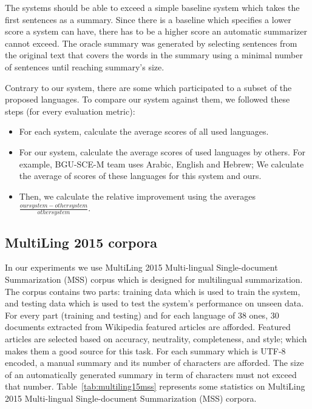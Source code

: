 The systems should be able to exceed a simple baseline system which takes the first sentences as a summary. 
Since there is a baseline which specifies a lower score a system can have, there has to be a higher score an automatic summarizer cannot exceed. 
The oracle summary was generated by selecting sentences from the original text that covers the words in the summary using a minimal number of sentences until reaching summary's size. 

Contrary to our system, there are some which participated to a subset of the proposed languages. 
To compare our system against them, we followed these steps (for every evaluation metric): 
\begin{itemize}
	\item For each system, calculate the average scores of all used languages.
	\item For our system, calculate the average scores of used languages by others. 
	For example, BGU-SCE-M team uses Arabic, English and Hebrew; 
	We calculate the average of scores of these languages for this system and ours.
	\item Then, we calculate the relative improvement using the averages $ \frac{our system - other system}{other system} $.
\end{itemize}



\subsection{MultiLing 2015 corpora}

In our experiments we use MultiLing 2015 Multi-lingual Single-document Summarization (MSS) corpus which is designed for multilingual summarization. 
The corpus contains two parts: training data which is used to train the system, and testing data which is used to test the system's performance on unseen data.
For every part (training and testing) and for each language of 38 ones, 30 documents extracted from Wikipedia featured articles are afforded.
Featured articles are selected based on accuracy, neutrality, completeness, and style; which makes them a good source for this task.
For each summary which is UTF-8 encoded, a manual summary and its number of characters are afforded. 
The size of an automatically generated summary in term of characters must not exceed that number.
Table~\ref{tab:multiling15mss} represents some statistics on MultiLing 2015 Multi-lingual Single-document Summarization (MSS) corpora.

